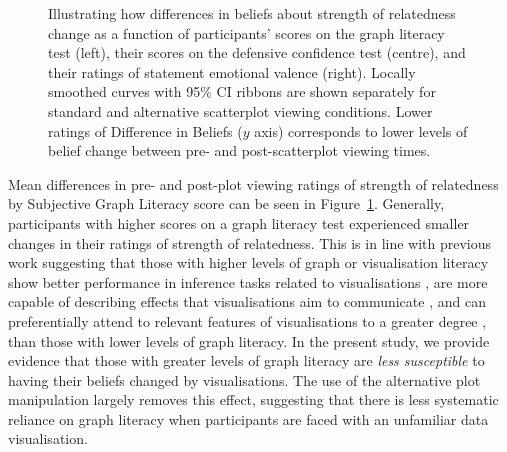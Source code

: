 \documentclass[sigconf]{acmart}
\begin{document}
\begin{figure}


\caption{\label{fig-add-analyses-plots}Illustrating how differences in
beliefs about strength of relatedness change as a function of
participants' scores on the graph literacy test (left), their scores on
the defensive confidence test (centre), and their ratings of statement
emotional valence (right). Locally smoothed curves with 95\% CI ribbons
are shown separately for standard and alternative scatterplot viewing
conditions. Lower ratings of Difference in Beliefs (\(y\) axis)
corresponds to lower levels of belief change between pre- and
post-scatterplot viewing times.}

\end{figure}%

Mean differences in pre- and post-plot viewing ratings of strength of
relatedness by Subjective Graph Literacy score can be seen in
Figure~\ref{fig-add-analyses-plots}. Generally, participants with higher
scores on a graph literacy test experienced smaller changes in their
ratings of strength of relatedness. This is in line with previous work
suggesting that those with higher levels of graph or visualisation
literacy show better performance in inference tasks related to
visualisations \citep{canham_2010}, are more capable of describing
effects that visualisations aim to communicate \citep{shah_2011}, and
can preferentially attend to relevant features of visualisations to a
greater degree \citep{okan_2016}, than those with lower levels of graph
literacy. In the present study, we provide evidence that those with
greater levels of graph literacy are \emph{less susceptible} to having
their beliefs changed by visualisations. The use of the alternative plot
manipulation largely removes this effect, suggesting that there is less
systematic reliance on graph literacy when participants are faced with
an unfamiliar data visualisation.
\end{document}
